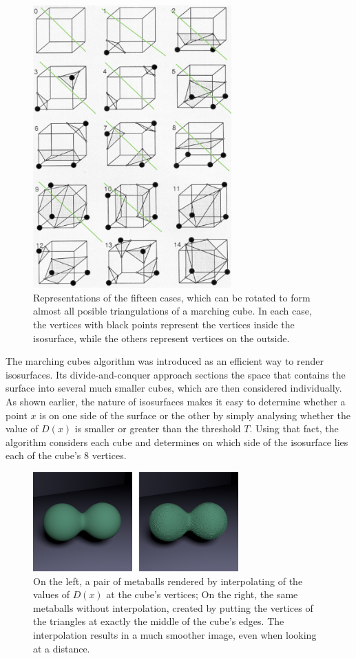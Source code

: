 \documentclass[conference]{acmsiggraph}
\begin{document}
\begin{figure}[ht]
  \centering
  \includegraphics[width=3in]{images/base-cases}
  \caption{Representations of the fifteen cases, which can be rotated to form almost all posible triangulations of a marching cube. In each case, the vertices with black points represent the vertices inside the isosurface, while the others represent vertices on the outside.}
  \label{img:base-cases}
\end{figure}

The marching cubes algorithm \cite{Lorensen:1987:MCH:37402.37422} was introduced as an efficient way to render isosurfaces. Its divide-and-conquer approach sections the space that contains the surface into several much smaller cubes, which are then considered individually. As shown earlier, the nature of isosurfaces makes it easy to determine whether a point $x$ is on one side of the surface or the other by simply analysing whether the value of $D(x)$ is smaller or greater than the threshold $T$. Using that fact, the algorithm considers each cube and determines on which side of the isosurface lies each of the cube's 8 vertices.

\begin{figure}[ht]
  \centering
  \includegraphics[height=1.5in]{images/metaball-interpolation-comparison}
  \caption{On the left, a pair of metaballs rendered by interpolating of the values of $D(x)$ at the cube's vertices; On the right, the same metaballs without interpolation, created by putting the vertices of the triangles at exactly the middle of the cube's edges. The interpolation results in a much smoother image, even when looking at a distance.}
  \label{img:interpolation}
\end{figure}
\end{document}
